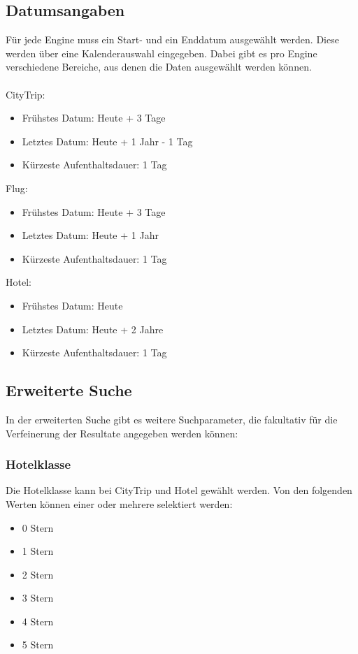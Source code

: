 \subsection{Datumsangaben}
Für jede Engine muss ein Start- und ein Enddatum ausgewählt werden. Diese werden über eine Kalenderauswahl eingegeben. Dabei gibt es pro Engine verschiedene Bereiche, aus denen die Daten ausgewählt werden können.\\
\\  
\noindent CityTrip:
\begin{itemize}
\item Frühstes Datum: Heute + 3 Tage
\item Letztes Datum: Heute + 1 Jahr - 1 Tag
\item Kürzeste Aufenthaltsdauer: 1 Tag
\end{itemize}
\vspace{0 mm}
Flug:
\begin{itemize}
\item Frühstes Datum: Heute + 3 Tage
\item Letztes Datum: Heute + 1 Jahr
\item Kürzeste Aufenthaltsdauer: 1 Tag
\end{itemize}
\vspace{0 mm}
Hotel:
\begin{itemize}
\item Frühstes Datum: Heute
\item Letztes Datum: Heute + 2 Jahre
\item Kürzeste Aufenthaltsdauer: 1 Tag
\end{itemize}

\subsection{Erweiterte Suche}
In der erweiterten Suche gibt es weitere Suchparameter, die fakultativ für die Verfeinerung der Resultate angegeben werden können:

\subsubsection{Hotelklasse}
Die Hotelklasse kann bei CityTrip und Hotel gewählt werden. Von den folgenden Werten können einer oder mehrere selektiert werden:
\begin{itemize}
\item 0 Stern
\item 1 Stern
\item 2 Stern
\item 3 Stern
\item 4 Stern
\item 5 Stern
\end{itemize}

